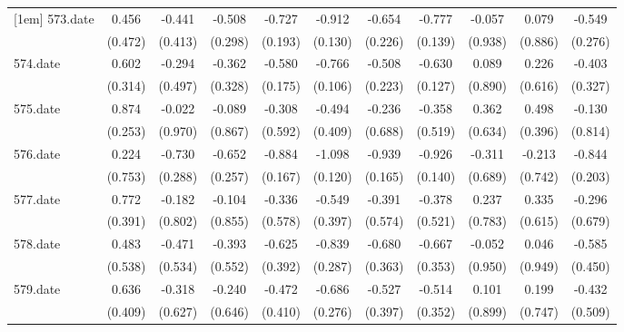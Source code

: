 \begin{tabular}{l*{10}{c}}
[1em]
573.date    &       0.456&      -0.441&      -0.508&      -0.727&      -0.912&      -0.654&      -0.777&      -0.057&       0.079&      -0.549\\
            &     (0.472)&     (0.413)&     (0.298)&     (0.193)&     (0.130)&     (0.226)&     (0.139)&     (0.938)&     (0.886)&     (0.276)\\
[1em]
574.date    &       0.602&      -0.294&      -0.362&      -0.580&      -0.766&      -0.508&      -0.630&       0.089&       0.226&      -0.403\\
            &     (0.314)&     (0.497)&     (0.328)&     (0.175)&     (0.106)&     (0.223)&     (0.127)&     (0.890)&     (0.616)&     (0.327)\\
[1em]
575.date    &       0.874&      -0.022&      -0.089&      -0.308&      -0.494&      -0.236&      -0.358&       0.362&       0.498&      -0.130\\
            &     (0.253)&     (0.970)&     (0.867)&     (0.592)&     (0.409)&     (0.688)&     (0.519)&     (0.634)&     (0.396)&     (0.814)\\
[1em]
576.date    &       0.224&      -0.730&      -0.652&      -0.884&      -1.098&      -0.939&      -0.926&      -0.311&      -0.213&      -0.844\\
            &     (0.753)&     (0.288)&     (0.257)&     (0.167)&     (0.120)&     (0.165)&     (0.140)&     (0.689)&     (0.742)&     (0.203)\\
[1em]
577.date    &       0.772&      -0.182&      -0.104&      -0.336&      -0.549&      -0.391&      -0.378&       0.237&       0.335&      -0.296\\
            &     (0.391)&     (0.802)&     (0.855)&     (0.578)&     (0.397)&     (0.574)&     (0.521)&     (0.783)&     (0.615)&     (0.679)\\
[1em]
578.date    &       0.483&      -0.471&      -0.393&      -0.625&      -0.839&      -0.680&      -0.667&      -0.052&       0.046&      -0.585\\
            &     (0.538)&     (0.534)&     (0.552)&     (0.392)&     (0.287)&     (0.363)&     (0.353)&     (0.950)&     (0.949)&     (0.450)\\
[1em]
579.date    &       0.636&      -0.318&      -0.240&      -0.472&      -0.686&      -0.527&      -0.514&       0.101&       0.199&      -0.432\\
            &     (0.409)&     (0.627)&     (0.646)&     (0.410)&     (0.276)&     (0.397)&     (0.352)&     (0.899)&     (0.747)&     (0.509)\\

\end{tabular}
